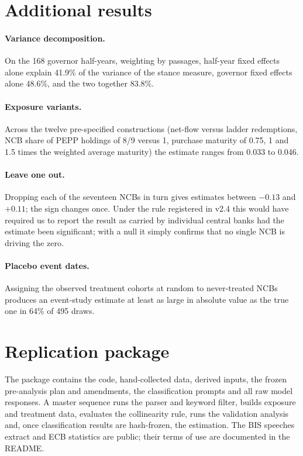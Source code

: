 \documentclass[11pt]{article}
\theoremstyle{plain}
\begin{document}
\section{Additional results}\label{app:extra}
\paragraph{Variance decomposition.} On the 168 governor half-years, weighting by passages, half-year fixed effects alone explain 41.9\% of the variance of the stance measure, governor fixed effects alone 48.6\%, and the two together 83.8\%.
\paragraph{Exposure variants.} Across the twelve pre-specified constructions (net-flow versus ladder redemptions, NCB share of PEPP holdings of 8/9 versus 1, purchase maturity of 0.75, 1 and 1.5 times the weighted average maturity) the estimate ranges from 0.033 to 0.046.
\paragraph{Leave one out.} Dropping each of the seventeen NCBs in turn gives estimates between $-0.13$ and $+0.11$; the sign changes once. Under the rule registered in v2.4 this would have required us to report the result as carried by individual central banks had the estimate been significant; with a null it simply confirms that no single NCB is driving the zero.
\paragraph{Placebo event dates.} Assigning the observed treatment cohorts at random to never-treated NCBs produces an event-study estimate at least as large in absolute value as the true one in 64\% of 495 draws.

\section{Replication package}\label{app:repl}
The package contains the code, hand-collected data, derived inputs, the frozen pre-analysis plan and amendments, the classification prompts and all raw model responses. A master sequence runs the parser and keyword filter, builds exposure and treatment data, evaluates the collinearity rule, runs the validation analysis and, once classification results are hash-frozen, the estimation. The BIS speeches extract and ECB statistics are public; their terms of use are documented in the README.
\end{document}
